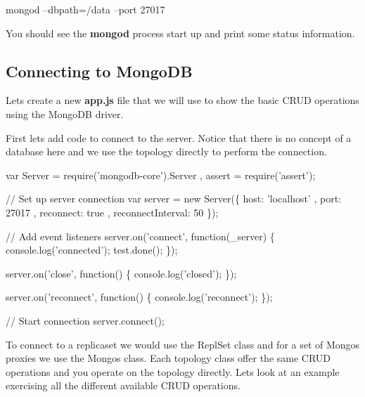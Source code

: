 \begin{DoxyCode}
mongod --dbpath=/data --port 27017
\end{DoxyCode}


You should see the {\bfseries mongod} process start up and print some status information.

\subsection*{Connecting to Mongo\+DB}

Let\textquotesingle{}s create a new {\bfseries app.\+js} file that we will use to show the basic C\+R\+UD operations using the Mongo\+DB driver.

First let\textquotesingle{}s add code to connect to the server. Notice that there is no concept of a database here and we use the topology directly to perform the connection.


\begin{DoxyCode}
var Server = require('mongodb-core').Server
  , assert = require('assert');

// Set up server connection
var server = new Server(\{
    host: 'localhost'
  , port: 27017
  , reconnect: true
  , reconnectInterval: 50
\});

// Add event listeners
server.on('connect', function(\_server) \{
  console.log('connected');
  test.done();
\});

server.on('close', function() \{
  console.log('closed');
\});

server.on('reconnect', function() \{
  console.log('reconnect');
\});

// Start connection
server.connect();
\end{DoxyCode}


To connect to a replicaset we would use the {\ttfamily Repl\+Set} class and for a set of Mongos proxies we use the {\ttfamily Mongos} class. Each topology class offer the same C\+R\+UD operations and you operate on the topology directly. Let\textquotesingle{}s look at an example exercising all the different available C\+R\+UD operations.


